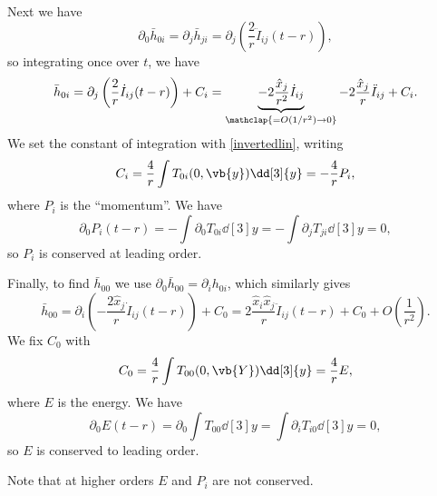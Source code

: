 \documentclass{jknotes}
\begin{document}
Next we have
\begin{equation}
    \partial_0 \bar{h}_{0i} = \partial_j \bar{h}_{ji} = \partial_j \left(\frac2r \ddot{I}_{ij}(t-r)\right),
\end{equation}
so integrating once over \(t\), we have
\begin{equation}
    \bar{h}_{0i} = \partial_j\left(\frac2r\dot{I}_{ij}(t-r)\right) + C_i= \underbrace{-2\frac{\hat{x}_j}{r^2}\dot{I}_{ij}}_{\mathclap{=O(1/r^2) \to 0}} - 2\frac{\hat{x}_j}{r}\ddot{I}_{ij} + C_i.
\end{equation}
We set the constant of integration with \eqref{invertedlin}, writing
\begin{equation}
    C_i = \frac4r \int T_{0i}(0,\vb{y})\dd[3]{y} = -\frac4r P_i,
\end{equation}
where \(P_i\) is the ``momentum''. We have
\begin{equation}
    \partial_0P_i(t-r) = -\int\partial_0 T_{0i}\dd[3]{y} = -\int\partial_j T_{ji}\dd[3]{y} = 0,
\end{equation}
so \(P_i\) is conserved at leading order.

Finally, to find \(\bar{h}_{00}\) we use \(\partial_0 \bar{h}_{00} = \partial_i h_{0i}\), which similarly gives
\begin{equation}
    \bar{h}_{00} = \partial_i\left(-\frac{2\hat{x}_j}{r}\dot{I}_{ij}(t-r)\right) + C_0 = 2\frac{\hat{x}_i\hat{x}_j}{r}\ddot{I}_{ij}(t-r) + C_0 + O\left(\frac1{r^2}\right).
\end{equation}
We fix \(C_0\) with
\begin{equation}
    C_0 = \frac4r \int T_{00}(0,\vb{Y})\dd[3]{y} = \frac4r E,
\end{equation}
where \(E\) is the energy. We have
\begin{equation}
    \partial_0 E(t-r) = \partial_0\int T_{00}\dd[3]{y} = \int \partial_i T_{i0} \dd[3]{y} = 0,
\end{equation}
so \(E\) is conserved to leading order.

Note that at higher orders \(E\) and \(P_i\) are not conserved.
\end{document}
